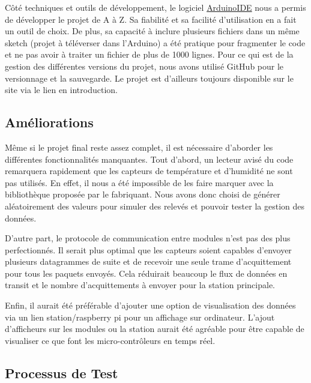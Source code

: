 \documentclass[a4paper]{article}
\begin{document}
\vspace{0.3cm}

Côté techniques et outils de développement, le logiciel \href{https://www.arduino.cc/en/software/}{ArduinoIDE} 
nous a permis de développer le projet de A à Z. Sa fiabilité et sa facilité d'utilisation en a fait un outil de choix. 
De plus, sa capacité à inclure plusieurs fichiers dans un même sketch (projet à téléverser dans l'Arduino) a été 
pratique pour fragmenter le code et ne pas avoir à traiter un fichier de plus de 1000 lignes. 
Pour ce qui est de la gestion des différentes versions du projet, nous avons utilisé GitHub pour le versionnage et la 
sauvegarde. Le projet est d'ailleurs toujours disponible sur le site via le lien en introduction. 

\subsection{Améliorations}

Même si le projet final reste assez complet, il est nécessaire d'aborder les différentes fonctionnalités manquantes. 
Tout d'abord, un lecteur avisé du code remarquera rapidement que les capteurs de température et d'humidité ne sont pas 
utilisés. En effet, il nous a été impossible de les faire marquer avec la bibliothèque proposée par le fabriquant. 
Nous avons donc choisi de générer aléatoirement des valeurs pour simuler des relevés et pouvoir tester la gestion des données. 

\vspace{0.3cm}

D'autre part, le protocole de communication entre modules n'est pas des plus perfectionnés. Il serait plus optimal 
que les capteurs soient capables d'envoyer plusieurs datagrammes de suite et de recevoir une seule trame 
d'acquittement pour tous les paquets envoyés. Cela réduirait beaucoup le flux de données en transit et le 
nombre d'acquittements à envoyer pour la station principale. 

\vspace{0.3cm}

Enfin, il aurait été préférable d'ajouter une option de visualisation des données via un lien station/raspberry pi 
pour un affichage sur ordinateur. L'ajout d'afficheurs sur les modules ou la station aurait été agréable pour être 
capable de visualiser ce que font les micro-contrôleurs en temps réel. 


\subsection{Processus de Test}
\end{document}
